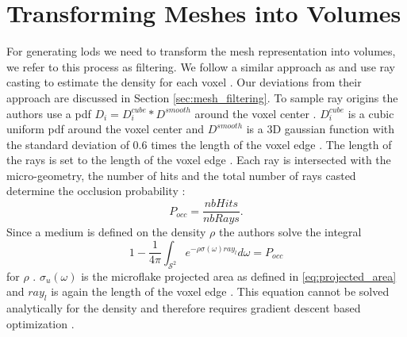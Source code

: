 \section{Transforming Meshes into Volumes}
\label{sec:transforming_meshes_into_volumes}
For generating \acp{lod} we need to transform the mesh representation into volumes, we refer to this process as filtering.
We follow a similar approach as \citeauthor{hybrid_mesh_volume_lods} and use ray casting to estimate the density for each voxel \cite{hybrid_mesh_volume_lods}.
Our deviations from their approach are discussed in Section \ref{sec:mesh_filtering}.
To sample ray origins the authors use a \ac{pdf} $D_i=D_i^{cube} \ast D^{smooth}$ around the voxel center \cite{hybrid_mesh_volume_lods}.
$D_i^{cube}$ is a cubic uniform \ac{pdf} around the voxel center and $D^{smooth}$ is a 3D gaussian function with the standard deviation of 0.6 times the length of the voxel edge \cite{hybrid_mesh_volume_lods}.
The length of the rays is set to the length of the voxel edge \cite{hybrid_mesh_volume_lods}.
Each ray is intersected with the micro-geometry, the number of hits and the total number of rays casted determine the occlusion probability \cite{hybrid_mesh_volume_lods}:
\begin{equation*}
    P_{occ}=\frac{nbHits}{nbRays}.
\end{equation*}
Since a medium is defined on the density $\rho$ the authors solve the integral
\begin{equation}
    1 - \frac{1}{4\pi}\int_{\mathcal{S}^2} e^{-\rho\sigma(\omega)ray_l} d\omega = P_{occ}
    \label{eq:loubet_filtering_equation}
\end{equation}
for $\rho$ \cite{hybrid_mesh_volume_lods}.
$\sigma_u(\omega)$ is the microflake projected area as defined in \ref{eq:projected_area} and $ray_l$ is again the length of the voxel edge \cite{hybrid_mesh_volume_lods}.
This equation cannot be solved analytically for the density and therefore requires gradient descent based optimization \cite{hybrid_mesh_volume_lods}.






